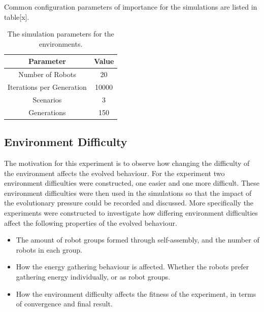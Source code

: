 Common configuration parameters of importance for the simulations are listed in table[x].

\begin{table}[H]
	\centering
	\label{tab-environment}
	\begin{tabular}{|c|c|}
		\hline Parameter & Value \\ 
		\hline Number of Robots & 20 \\ 
		\hline Iterations per Generation & 10000 \\
		\hline Scenarios & 3 \\ 
		\hline Generations & 150 \\ 
		\hline 
		
	\end{tabular} 
	\caption{The simulation parameters for the environments.}
\end{table}



\newpage
\pagestyle{plain}

%

\newpage

%

\newpage

%

\newpage
\pagestyle{main}

\subsection{Environment Difficulty}
The motivation for this experiment is to observe how changing the difficulty of the environment affects the evolved behaviour.
For the experiment two environment difficulties were constructed, one easier and one more difficult.
These environment difficulties were then used in the simulations so that the impact of the evolutionary pressure could be recorded and discussed.
More specifically the experiments were constructed to investigate how differing environment difficulties affect the following properties of the evolved behaviour.

\begin{itemize}
	\item The amount of robot groups formed through self-assembly, and the number of robots in each group.
	\item How the energy gathering behaviour is affected. Whether the robots prefer gathering energy individually, or as robot groups. 
	\item How the environment difficulty affects the fitness of the experiment, in terms of convergence and final result.
\end{itemize}


